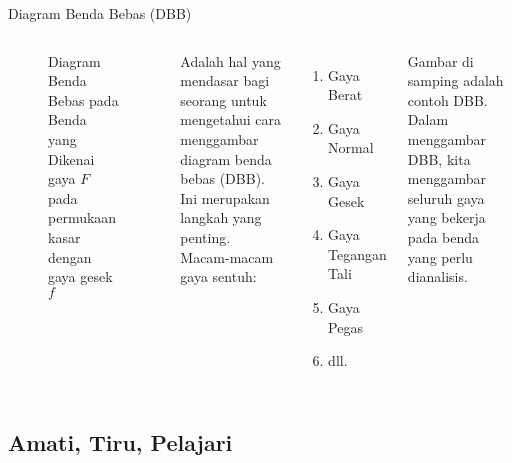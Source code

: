 \documentclass[10pt,aspectratio=54, handout]{beamer}
\begin{document}
  \begin{frame}{Diagram Benda Bebas (DBB)}
  \begin{columns}[c]
    
    
  \begin{figure}[h!]
  \begin{center}
  \end{center}
  \caption{Diagram Benda Bebas pada Benda yang Dikenai gaya $F$ pada permukaan kasar dengan gaya gesek $f$}
  \label{fig:}
  \end{figure}
  
  
    Adalah hal yang mendasar bagi seorang untuk mengetahui cara menggambar diagram benda bebas (DBB). Ini merupakan langkah yang penting.\\
    Macam-macam gaya sentuh:
    \begin{enumerate}
      \item Gaya Berat
      \item Gaya Normal
      \item Gaya Gesek
      \item Gaya Tegangan Tali
      \item Gaya Pegas
      \item dll.
    \end{enumerate}
    Gambar di samping adalah contoh DBB. Dalam menggambar DBB, kita menggambar seluruh gaya yang bekerja pada benda yang perlu dianalisis.
    
  \end{columns}
  
  \end{frame}
  
  \subsection{Amati, Tiru, Pelajari}
  
\end{document}
